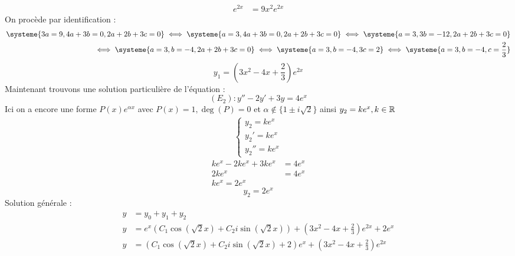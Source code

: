\begin{example}
\begin{align*}
        [3ax^2 + (4a + 3b)x + (2a + 2b + 3c)]e^{2x} &= 9x^2 e^{2x}
    \end{align*}
    On procède par identification :
    \begin{align*}
        \systeme{
            3a = 9,
            4a + 3b = 0,
            2a + 2b + 3c = 0
        }
        \iff 
        \systeme{
            a = 3,
            4a + 3b = 0,
            2a + 2b + 3c = 0
        }
        \iff 
        \systeme{
            a = 3,
            3b = -12,
            2a + 2b + 3c = 0
        }
        \\ 
        \iff 
        \systeme{
            a = 3,
            b = -4,
            2a + 2b + 3c = 0
        }
        \iff 
        \systeme{
            a = 3,
            b = -4,
            3c = 2
        }
        \iff 
        \systeme{
            a = 3,
            b = -4,
            c = \frac{2}{3}
        }
    \end{align*}
    \[ y_1 = \left(3x^2 - 4x + \frac{2}{3} \right)e^{2x} \]
    Maintenant trouvons une solution particulière de l'équation :
    \[ (E_2) : y'' - 2y' + 3y = 4e^x \]
    Ici on a encore une forme $P(x)e^{\alpha x}$ avec $P(x) = 1, \deg(P) = 0$ et $\alpha \notin \{ 1 \pm i \sqrt{2} \}$ ainsi $y_2 = k e^{x}, k \in \mathbb{R}$
    \begin{align*}
        \begin{cases}
            y_2 = k e^{x} \\
            y_2' = k e^{x} \\
            y_2'' = k e^{x}
        \end{cases}
    \end{align*}
    \begin{align*}
        k e^{x} -2k e^{x} + 3k e^{x} &= 4e^x \\ 
        2k e^x &= 4e^x \\
        k e^x = 2e^x
    \end{align*}
    \[ y_2 = 2e^x \]
    Solution générale :
    \begin{align*}
        y &= y_0 + y_1 + y_2 \\
        y &= e^x \left(C_1 \cos(\sqrt{2}x) + C_2 i \sin(\sqrt{2}x) \right) + \left(3x^2 - 4x + \frac{2}{3} \right)e^{2x} + 2e^x \\
        y &= \left(C_1 \cos(\sqrt{2}x) + C_2 i \sin(\sqrt{2}x) + 2 \right)e^x + \left(3x^2 - 4x + \frac{2}{3} \right)e^{2x}
    \end{align*} 
\end{example}
